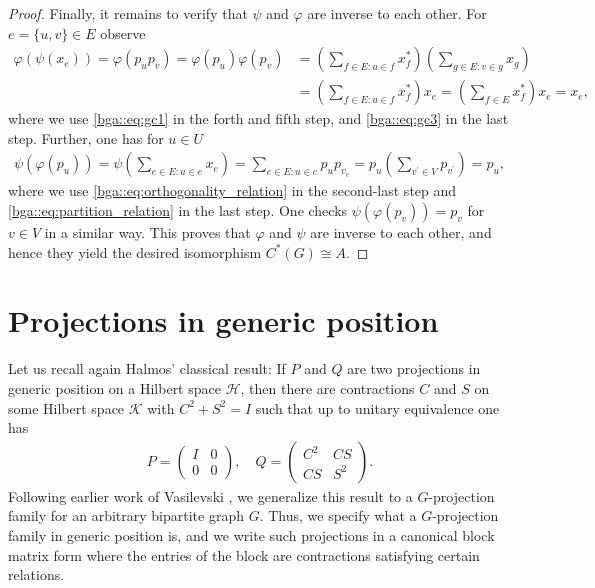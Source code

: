 \documentclass[a4paper]{amsart}
\begin{document}
\begin{proof}
    Finally, it remains to verify that $\psi$ and $\varphi$ are inverse to each other. For $e = \{u,v\} \in E$ observe
    \begin{align*}
        \varphi(\psi(x_e)) = \varphi(p_u p_v) 
            = \varphi(p_u) \varphi(p_v)  
            &= \left( \sum_{f \in E: u \in f} x_f^\ast \right) \left( \sum_{g \in E: v \in g} x_g \right) \\
            &= \left( \sum_{f \in E: u \in f} x_f^\ast \right) x_e
            = \left(\sum_{f \in E} x_f^\ast \right) x_e
            = x_e,
    \end{align*}
    where we use \eqref{bga::eq:gc1} in the forth and fifth step, and \eqref{bga::eq:gc3} in the last step. Further, one has for $u \in U$
    \begin{align*}
        \psi(\varphi(p_u)) = \psi\left( \sum_{e \in E: u \in e} x_e \right) 
            = \sum_{e  \in E: u \in e} p_u p_{v_e}
            = p_u \left( \sum_{v^\prime \in V} p_{v^\prime} \right) 
            = p_u,
    \end{align*}
    where we use \eqref{bga::eq:orthogonality_relation} in the second-last step and \eqref{bga::eq:partition_relation} in the last step.
    One checks $\psi(\varphi(p_v))=p_v$ for $v \in V$ in a similar way. This proves that $\varphi$ and $\psi$ are inverse to each other, and hence they yield the desired isomorphism $C^\ast(G) \cong A$.
\end{proof}

\section{Projections in generic position}
\label{sec::generic_position}

Let us recall again Halmos' classical result: If $P$ and $Q$ are two projections in generic position on a Hilbert space $\mathcal{H}$, then there are contractions $C$ and $S$ on some Hilbert space $\mathcal{K}$ with $C^2 + S^2 = I$ such that up to unitary equivalence one has
\begin{align*}
    P = \begin{pmatrix}
        I & 0 \\
        0 & 0
    \end{pmatrix},
    \quad
    Q = \begin{pmatrix} 
        C^2 & CS \\
        CS & S^2
    \end{pmatrix}.
\end{align*}
Following earlier work of Vasilevski \cite{vasilevski_c-algebras_1998}, we generalize this result to a $G$-projection family for an arbitrary bipartite graph $G$. Thus, we specify what a $G$-projection family in generic position is, and we write such projections in a canonical block matrix form where the entries of the block are contractions satisfying certain relations.
\end{document}
